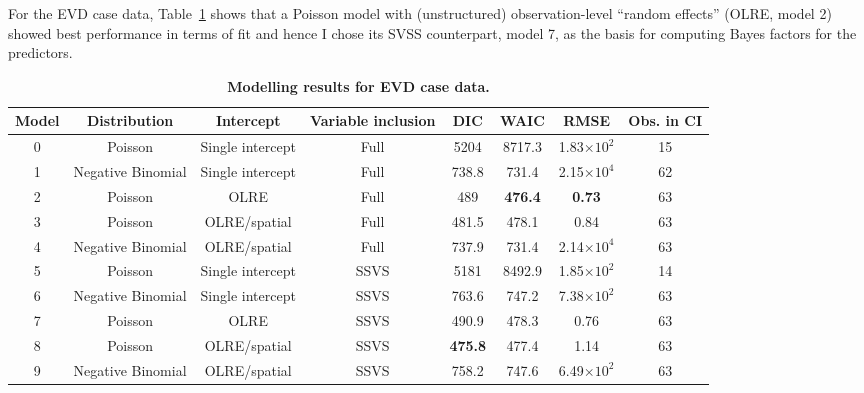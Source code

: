 For the EVD case data, Table~\ref{tab:casesModels} shows that a Poisson model with (unstructured) observation-level ``random effects'' (OLRE, model 2) showed best performance in terms of fit and hence I chose its SVSS counterpart, model 7, as the basis for computing Bayes factors for the predictors.

\begin{minipage}{\textwidth}    
\setcounter{mpfootnote}{\value{footnote}}
\renewcommand{\thempfootnote}{\arabic{mpfootnote}}
\fontsize{9}{10}\selectfont
{}
\begin{longtable}{cccccccc}
\caption[Modelling results for EVD case data.]{\textbf{Modelling results for EVD case data.}
}
\label{tab:casesModels}\\
\toprule
Model & Distribution & Intercept& Variable inclusion & DIC  & WAIC   & RMSE\footnotemark[1] & Obs. in CI\footnotemark[2]\\
\toprule
0  & Poisson & Single intercept & Full & 5204  & 8717.3 & 1.83$\times 10^2$ & 15\\
\hline
1   & Negative Binomial & Single intercept & Full & 738.8 & 731.4  & 2.15$\times 10^4$& 62\\
\hline
2 & Poisson & OLRE & Full & 489   & \textbf{476.4} & \textbf{0.73} & 63\\
\hline
3 & Poisson & OLRE/spatial\footnotemark[3] & Full & 481.5 & 478.1  & 0.84 & 63 \\
\hline
4 & Negative Binomial & OLRE/spatial\footnotemark[4] & Full & 737.9 & 731.4 & 2.14$\times 10^4$ & 63\\
\hline
5 & Poisson  & Single intercept & SSVS & 5181  & 8492.9 & 1.85$\times 10^2$ & 14\\
\hline
6 & Negative Binomial & Single intercept & SSVS & 763.6 & 747.2  & 7.38$\times 10^2$& 63\\
\hline
7 & Poisson & OLRE & SSVS & 490.9 & 478.3  & 0.76   & 63\\
\hline
8 & Poisson & OLRE/spatial\footnotemark[3] & SSVS & \textbf{475.8} & 477.4  & 1.14 & 63\\
\hline
9 & Negative Binomial & OLRE/spatial\footnotemark[4]& SSVS & 758.2 & 747.6 & 6.49$\times 10^2$ & 63\\
\bottomrule
\end{longtable}
\setcounter{footnote}{\value{mpfootnote}}
\end{minipage}

